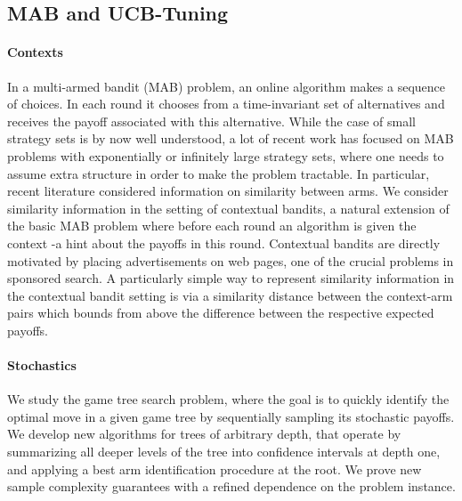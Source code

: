 \subsection{MAB and UCB-Tuning}
\paragraph{Contexts} 
\cite{slivkins2014contextual}
In a multi-armed bandit (MAB) problem, an online algorithm makes a sequence of choices. In each round it chooses from a time-invariant set of alternatives and receives the payoff associated with this alternative. While the case of small strategy sets is by now well understood, a lot of recent work has focused on MAB problems with exponentially or infinitely large strategy sets, where one needs to assume extra structure in order to make the problem tractable. In particular, recent literature considered information on similarity between arms.
We consider similarity information in the setting of contextual bandits, a natural extension of the basic MAB problem where before each round an algorithm is given the context -a hint about the payoffs in this round. Contextual bandits are directly motivated by placing advertisements on web pages, one of the crucial problems in sponsored search. A particularly simple way to represent similarity information in the contextual bandit setting is via a similarity distance between the context-arm pairs which bounds from above the difference between the respective expected payoffs.
\paragraph{Stochastics}
\cite{kaufmann2017monte}
We study the game tree search problem, where the goal is to quickly identify the optimal move in a given game tree by sequentially sampling its stochastic payoffs. We develop new algorithms for trees of arbitrary depth, that operate by summarizing all deeper levels of the tree into confidence intervals at depth one, and applying a best arm identification procedure at the root. We prove new sample complexity guarantees with a refined dependence on the problem instance.
